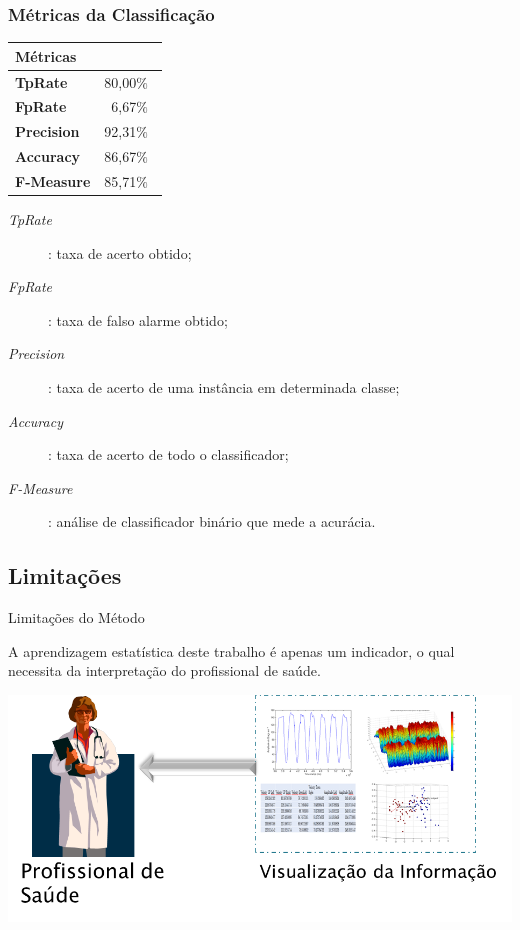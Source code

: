 \documentclass{beamer}
\begin{document}
\begin{frame}
   \frametitle{Métricas da Classificação}
   \begin{block}{}
   		\begin{table}[!htbp]
				\label{table:metricasmatrizconfusao}
				\centering
				\begin{tabular}{|l|r|}
				\hline
				\multicolumn{2}{|l|}{\textbf{Métricas}} \\ \hline
				\textbf{TpRate}                    & 80,00$\%$\               \\ \hline
				\textbf{FpRate}                    & 6,67$\%$\                \\ \hline
				\textbf{Precision}                 & 92,31$\%$\                \\ \hline
				\textbf{Accuracy}                  & 86,67$\%$\                \\ \hline
				\textbf{F-Measure}                 & 85,71$\%$\                \\ \hline
				\end{tabular}
				\end{table}
	\end{block}
     \begin{block}{}
				\begin{description}
				\item [\textit{TpRate}]: taxa de acerto obtido;
				\item [\textit{FpRate}]: taxa de falso alarme obtido;
				\item [\textit{Precision}]: taxa de acerto de uma instância em determinada classe;
				\item [\textit{Accuracy}]: taxa de acerto de todo o classificador;
				\item [\textit{F-Measure}]: análise de classificador binário que mede a acurácia.
				\end{description}
    \end{block}
\end{frame}

\subsection{Limitações}
\begin{frame}{Limitações do Método}
	\begin{block}{}
	A aprendizagem estatística deste trabalho é apenas um indicador, o qual necessita da interpretação do profissional de saúde.
	\end{block}
  \begin{block}{}
      \center \includegraphics[height=2 in]{img/visualizacaomedico.png}
  \end{block}
\end{frame}
\end{document}
